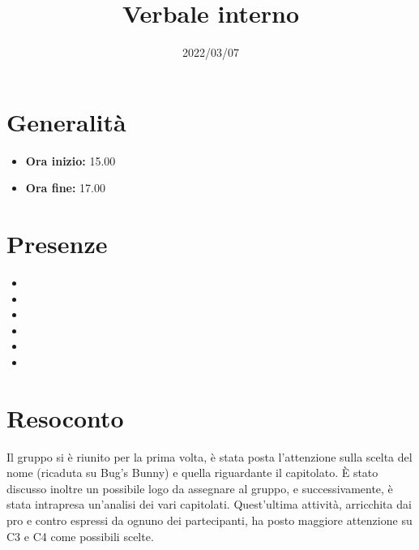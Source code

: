\documentclass{classes/base}
\title{Verbale interno}
\date{2022/03/07}
\author{\giulio}
\renewcommand{\maketitle}{
    
}
\begin{document}
    \maketitle

    \section*{Generalità}
    \begin{itemize}
        \item \textbf{Ora inizio:} 15.00
        \item \textbf{Ora fine:} 17.00
    \end{itemize}

    \section*{Presenze}
    \begin{itemize}
     	\item \angela
        \item \marcob
        \item \tommaso
        \item \ruth
        \item \marcov
        \item \giulio
    \end{itemize}

    \section*{Resoconto}
    Il gruppo si è riunito per la prima volta, è stata posta l'attenzione sulla scelta del nome (ricaduta su Bug's Bunny) e quella riguardante il capitolato.  
    È stato discusso inoltre un possibile logo da assegnare al gruppo, e successivamente, è stata intrapresa un'analisi dei vari capitolati.
    Quest'ultima attività, arricchita dai pro e contro espressi da ognuno dei partecipanti, ha posto maggiore attenzione su C3 e C4 come possibili scelte.
\end{document}
